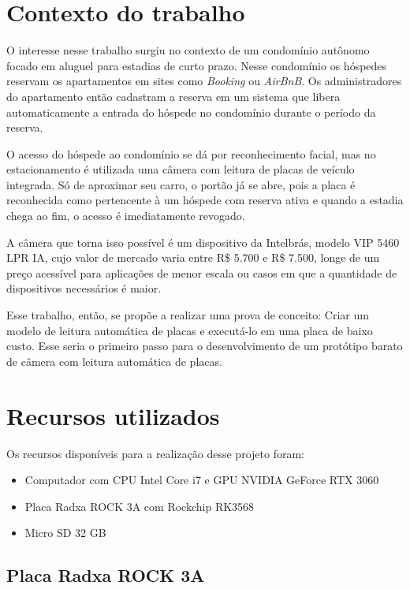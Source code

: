 \section{Contexto do trabalho}

O interesse nesse trabalho surgiu no contexto de um condomínio autônomo focado em aluguel para estadias de curto prazo. Nesse condomínio os hóspedes reservam os apartamentos em sites como \textit{Booking} ou \textit{AirBnB}. Os administradores do apartamento então cadastram a reserva em um sistema que libera automaticamente a entrada do hóspede no condomínio durante o período da reserva. 

O acesso do hóspede ao condomínio se dá por reconhecimento facial, mas no estacionamento é utilizada uma câmera com leitura de placas de veículo integrada. Só de aproximar seu carro, o portão já se abre, pois a placa é reconhecida como pertencente à um hóspede com reserva ativa e quando a estadia chega ao fim, o acesso é imediatamente revogado.

A câmera que torna isso possível é um dispositivo da Intelbrás, modelo VIP 5460 LPR IA, cujo valor de mercado varia entre R\$ 5.700 e R\$ 7.500, longe de um preço acessível para aplicações de menor escala ou casos em que a quantidade de dispositivos necessários é maior.

Esse trabalho, então, se propõe a realizar uma prova de conceito: Criar um modelo de leitura automática de placas e executá-lo em uma placa de baixo custo. Esse seria o primeiro passo para o desenvolvimento de um protótipo barato de câmera com leitura automática de placas.

\section{Recursos utilizados}

Os recursos disponíveis para a realização desse projeto foram:

\begin{itemize}
	\item Computador com CPU Intel Core i7 e GPU NVIDIA GeForce RTX 3060
	\item Placa Radxa ROCK 3A com Rockchip RK3568
	\item Micro SD 32 GB
\end{itemize}

\subsection{Placa Radxa ROCK 3A}

